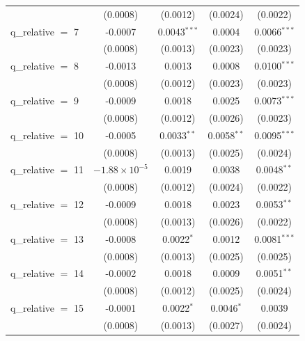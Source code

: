 \begin{tabular}{lcccc}
                        & (0.0008)               & (0.0012)       & (0.0024)        & (0.0022)\\   
   q\_relative $=$ 7    & -0.0007                & 0.0043$^{***}$ & 0.0004          & 0.0066$^{***}$\\   
                        & (0.0008)               & (0.0013)       & (0.0023)        & (0.0023)\\   
   q\_relative $=$ 8    & -0.0013                & 0.0013         & 0.0008          & 0.0100$^{***}$\\   
                        & (0.0008)               & (0.0012)       & (0.0023)        & (0.0023)\\   
   q\_relative $=$ 9    & -0.0009                & 0.0018         & 0.0025          & 0.0073$^{***}$\\   
                        & (0.0008)               & (0.0012)       & (0.0026)        & (0.0023)\\   
   q\_relative $=$ 10   & -0.0005                & 0.0033$^{**}$  & 0.0058$^{**}$   & 0.0095$^{***}$\\   
                        & (0.0008)               & (0.0013)       & (0.0025)        & (0.0024)\\   
   q\_relative $=$ 11   & $-1.88\times 10^{-5}$  & 0.0019         & 0.0038          & 0.0048$^{**}$\\   
                        & (0.0008)               & (0.0012)       & (0.0024)        & (0.0022)\\   
   q\_relative $=$ 12   & -0.0009                & 0.0018         & 0.0023          & 0.0053$^{**}$\\   
                        & (0.0008)               & (0.0013)       & (0.0026)        & (0.0022)\\   
   q\_relative $=$ 13   & -0.0008                & 0.0022$^{*}$   & 0.0012          & 0.0081$^{***}$\\   
                        & (0.0008)               & (0.0013)       & (0.0025)        & (0.0025)\\   
   q\_relative $=$ 14   & -0.0002                & 0.0018         & 0.0009          & 0.0051$^{**}$\\   
                        & (0.0008)               & (0.0012)       & (0.0025)        & (0.0024)\\   
   q\_relative $=$ 15   & -0.0001                & 0.0022$^{*}$   & 0.0046$^{*}$    & 0.0039\\   
                        & (0.0008)               & (0.0013)       & (0.0027)        & (0.0024)\\   

\end{tabular}
